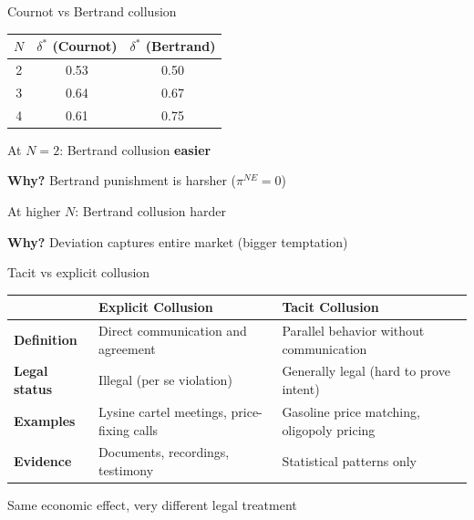 \documentclass[notes,11pt, aspectratio=169]{beamer}
\newenvironment{wideitemize}{\itemize\addtolength{\itemsep}{10pt}}{\enditemize}
\begin{document}
\begin{frame}{Cournot vs Bertrand collusion}
	\begin{center}
		\begin{tabular}{|c|c|c|}
			\hline
			$N$ & $\delta^*$ (Cournot) & $\delta^*$ (Bertrand) \\
			\hline
			2 & 0.53 & 0.50 \\
			3 & 0.64 & 0.67 \\
			4 & 0.61 & 0.75 \\
			\hline
		\end{tabular}
	\end{center}
	\vspace{10pt}
	\begin{wideitemize}
		\item At $N = 2$: Bertrand collusion \textbf{easier}
		\item \textbf{Why?} Bertrand punishment is harsher ($\pi^{NE} = 0$)
		\item At higher $N$: Bertrand collusion harder
		\item \textbf{Why?} Deviation captures entire market (bigger temptation)
	\end{wideitemize}
\end{frame}

\begin{frame}{Tacit vs explicit collusion}
	\begin{center}
		\begin{tabular}{|p{3cm}|p{4.5cm}|p{4.5cm}|}
			\hline
			& \textbf{Explicit Collusion} & \textbf{Tacit Collusion} \\
			\hline
			\textbf{Definition} & Direct communication and agreement & Parallel behavior without communication \\
			\hline
			\textbf{Legal status} & Illegal (per se violation) & Generally legal (hard to prove intent) \\
			\hline
			\textbf{Examples} & Lysine cartel meetings, price-fixing calls & Gasoline price matching, oligopoly pricing \\
			\hline
			\textbf{Evidence} & Documents, recordings, testimony & Statistical patterns only \\
			\hline
		\end{tabular}
	\end{center}
	\vspace{5pt}
	\begin{wideitemize}
		\item Same economic effect, very different legal treatment
	\end{wideitemize}
\end{frame}
\end{document}
